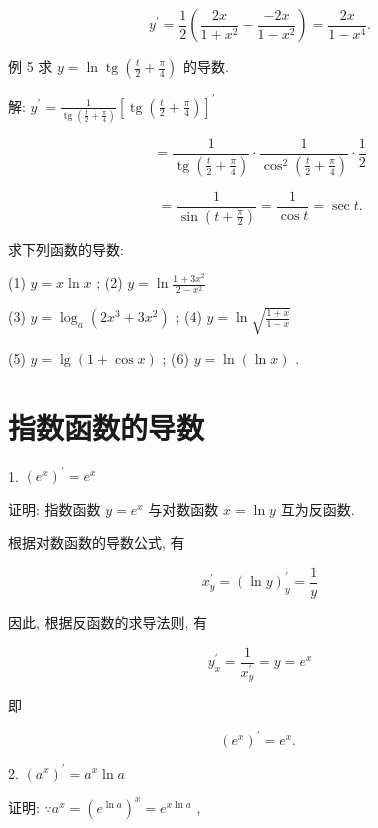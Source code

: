 \documentclass[lang=cn,newtx,10pt,scheme=chinese]{elegantbook}
\begin{document}
\[
{y}^{\prime } = \frac{1}{2}\left( {\frac{2x}{1 + {x}^{2}} - \frac{-{2x}}{1 - {x}^{2}}}\right) = \frac{2x}{1 - {x}^{4}}.
\]

例 5 求 \(y = \ln \operatorname{tg}\left( {\frac{t}{2} + \frac{\pi }{4}}\right)\) 的导数.

解: \({y}^{\prime } = \frac{1}{\operatorname{tg}\left( {\frac{t}{2} + \frac{\pi }{4}}\right) }{\left\lbrack \operatorname{tg}\left( \frac{t}{2} + \frac{\pi }{4}\right) \right\rbrack }^{\prime }\)

\[
= \frac{1}{\operatorname{tg}\left( {\frac{t}{2} + \frac{\pi }{4}}\right) } \cdot \frac{1}{{\cos }^{2}\left( {\frac{t}{2} + \frac{\pi }{4}}\right) } \cdot \frac{1}{2}
\]

\[
= \frac{1}{\sin \left( {t + \frac{\pi }{2}}\right) } = \frac{1}{\cos t} = \sec t.
\]

\begin{problemset}[练习]

\item 求下列函数的导数:

(1) \(y = x\ln x\) ; (2) \(y = \ln \frac{1 + 3{x}^{2}}{2 - {x}^{2}}\)

(3) \(y = {\log }_{a}\left( {2{x}^{3} + 3{x}^{2}}\right)\) ; (4) \(y = \ln \sqrt{\frac{1 + x}{1 - x}}\)

(5) \(y = \lg \left( {1 + \cos x}\right)\) ; (6) \(y = \ln \left( {\ln x}\right)\) .

\end{problemset}

\section{指数函数的导数}
\begin{conclusion}
	1. \({\left( {e}^{x}\right) }^{\prime } = {e}^{x}\)
\end{conclusion}

证明: 指数函数 \(y = {e}^{x}\) 与对数函数 \(x = \ln y\) 互为反函数.

根据对数函数的导数公式, 有

\[
{x}_{y}^{\prime } = {\left( \ln y\right) }_{y}^{\prime } = \frac{1}{y}
\]

因此, 根据反函数的求导法则, 有

\[
{y}_{x}^{\prime } = \frac{1}{{x}_{y}^{\prime }} = y = {e}^{x}
\]

即

\[
{\left( {e}^{x}\right) }^{\prime } = {e}^{x}\text{. }
\]

\begin{conclusion}
	2. \({\left( {a}^{x}\right) }^{\prime } = {a}^{x}\ln a\)
\end{conclusion}
证明: \(\because {a}^{x} = {\left( {e}^{\ln a}\right) }^{x} = {e}^{x\ln a}\) ,
\end{document}
